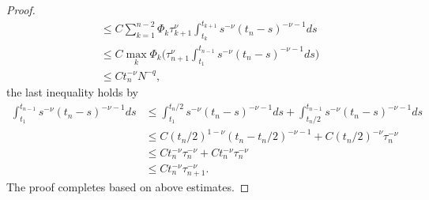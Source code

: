 \documentclass[10pt,a4paper]{amsart}
\begin{document}
\begin{proof}
\begin{align*}
&\le C\sum_{k=1}^{n-2}\Phi_k\tau_{k+1}^\nu \int_{t_k}^{t_{k+1}}s^{-\nu}(t_n-s)^{-\nu-1}ds\\
&\le C\max_k\Phi_k\bigg(\tau_{n+1}^\nu \int_{t_1}^{t_{n-1}}s^{-\nu}(t_n-s)^{-\nu-1}ds\bigg)\\
&\le Ct_n^{-\nu}N^{-q},
\end{align*}
the last inequality holds by 
\begin{align*}
\int_{t_1}^{t_{n-1}}s^{-\nu}(t_n-s)^{-\nu-1}ds
&\le \int_{t_1}^{t_{n}/2}s^{-\nu}(t_n-s)^{-\nu-1}ds+\int_{t_{n}/2}^{t_{n-1}}s^{-\nu}(t_n-s)^{-\nu-1}ds\\
&\le C(t_n/2)^{1-\nu}(t_n-t_n/2)^{-\nu-1}+C(t_n/2)^{-\nu}\tau_n^{-\nu}\\
&\le Ct_n^{-\nu}\tau_n^{-\nu}+Ct_n^{-\nu}\tau_n^{-\nu}\\
&\le Ct_n^{-\nu}\tau_{n+1}^{-\nu}.
\end{align*}
The proof completes based on above estimates.
\end{proof}
\end{document}
